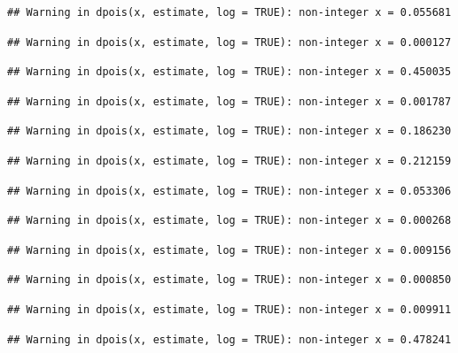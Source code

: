 \documentclass[]{article}
\begin{document}
\begin{verbatim}
## Warning in dpois(x, estimate, log = TRUE): non-integer x = 0.055681
\end{verbatim}

\begin{verbatim}
## Warning in dpois(x, estimate, log = TRUE): non-integer x = 0.000127
\end{verbatim}

\begin{verbatim}
## Warning in dpois(x, estimate, log = TRUE): non-integer x = 0.450035
\end{verbatim}

\begin{verbatim}
## Warning in dpois(x, estimate, log = TRUE): non-integer x = 0.001787
\end{verbatim}

\begin{verbatim}
## Warning in dpois(x, estimate, log = TRUE): non-integer x = 0.186230
\end{verbatim}

\begin{verbatim}
## Warning in dpois(x, estimate, log = TRUE): non-integer x = 0.212159
\end{verbatim}

\begin{verbatim}
## Warning in dpois(x, estimate, log = TRUE): non-integer x = 0.053306
\end{verbatim}

\begin{verbatim}
## Warning in dpois(x, estimate, log = TRUE): non-integer x = 0.000268
\end{verbatim}

\begin{verbatim}
## Warning in dpois(x, estimate, log = TRUE): non-integer x = 0.009156
\end{verbatim}

\begin{verbatim}
## Warning in dpois(x, estimate, log = TRUE): non-integer x = 0.000850
\end{verbatim}

\begin{verbatim}
## Warning in dpois(x, estimate, log = TRUE): non-integer x = 0.009911
\end{verbatim}

\begin{verbatim}
## Warning in dpois(x, estimate, log = TRUE): non-integer x = 0.478241
\end{verbatim}
\end{document}
